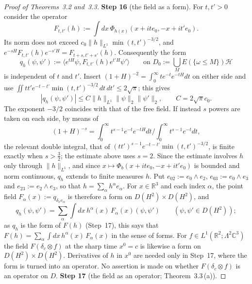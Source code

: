 \documentclass[11pt,letterpaper,reqno]{amsart}
\theoremstyle{definition}
\begin{document}
\begin{proof}[Proof of Theorems~3.2 and~3.3]
\textbf{Step 16} (the field as a form).
For $t,t'>0$ consider the operator
\begin{equation*}
F_{t,t'}(h):=\int dx\,\Phi_{h(x)}(x+ite_0,-x+it'e_0).
\end{equation*}
Its norm does not exceed $c_0\|h\|_{L^1}\min(t,t')^{-3/2}$, and $e^{-sH}F_{t,t'}(h)e^{-s'H}=F_{t+s,t'+s'}(h)$.
Consequently the form
\begin{equation*}
q_h(\psi,\psi'):=\langle e^{tH}\psi,F_{t,t'}(h)e^{t'H}\psi'\rangle\qquad\text{on }D_0:=\bigcup_ME(\{\omega\le M\})\mathcal H
\end{equation*}
is independent of $t$ and $t'$.
Insert $(1+H)^{-2}=\int_0^\infty te^{-t}e^{-tH}dt$ on either side and use $\iint tt'e^{-t-t'}\min(t,t')^{-3/2}\,dt\,dt'\le2\sqrt\pi$; this gives
\begin{equation*}
|q_h(\psi,\psi')|\le C\|h\|_{L^1}\|\psi\|_2\|\psi'\|_2,\qquad C=2\sqrt\pi c_0.
\end{equation*}
The exponent $-3/2$ coincides with that of the free field.
If instead $s$ powers are taken on each side, by means of
\begin{equation*}
(1+H)^{-s}=\int_0^\infty t^{s-1}e^{-t}e^{-tH}dt\Big/\int_0^\infty t^{s-1}e^{-t}dt,
\end{equation*}
the relevant double integral, that of $(tt')^{s-1}e^{-t-t'}\min(t,t')^{-3/2}$, is finite exactly when $s>\frac32$; the estimate above uses $s=2$.
Since the estimate involves $h$ only through $\|h\|_{L^1}$, and since $x\mapsto\Phi_b(x+ite_0,-x+it'e_0)$ is bounded and norm continuous, $q_h$ extends to finite measures $h$.
Put $e_{02}:=e_0\wedge e_2$, $e_{03}:=e_0\wedge e_3$ and $e_{23}:=e_2\wedge e_3$, so that $h=\sum_\alpha h^\alpha e_\alpha$.
For $x\in\mathbb R^3$ and each index $\alpha$, the point field $F_\alpha(x):=q_{\delta_xe_\alpha}$ is therefore a form on $D(H^2)\times D(H^2)$, and
\begin{equation*}
q_h(\psi,\psi')=\sum_\alpha\int dx\,h^\alpha(x)\,F_\alpha(x)(\psi,\psi')\qquad(\psi,\psi'\in D(H^2));
\end{equation*}
as $q_h$ is the form of $F(h)$ (Step~17), this says that $F(h)=\sum_\alpha\int dx\,h^\alpha(x)\,F_\alpha(x)$ in the sense of forms.
For $f\in L^1(\mathbb R^2;\Lambda^2\mathbb C^3)$ the field $F(\delta_c\otimes f)$ at the sharp time $x^0=c$ is likewise a form on $D(H^2)\times D(H^2)$.
Derivatives of $h$ in $x^0$ are needed only in Step~17, where the form is turned into an operator.
No assertion is made on whether $F(\delta_c\otimes f)$ is an operator on $D$.
\textbf{Step 17} (the field as an operator; Theorem~3.3\,(a)).

\end{proof}
\end{document}

